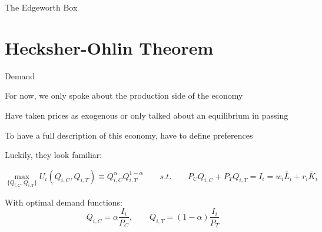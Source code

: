 \documentclass[notes,11pt, aspectratio=169, xcolor=table]{beamer}
\newenvironment{wideitemize}{\itemize\addtolength{\itemsep}{10pt}}{\enditemize}
\begin{document}
\begin{frame}{The Edgeworth Box}

\end{frame}


\section{Hecksher-Ohlin Theorem}

\begin{frame}{Demand}

\begin{wideitemize}
    \item For now, we only spoke about the production side of the economy
    \item Have taken prices as exogenous or only talked about an equilibrium in passing
    \item To have a full description of this economy, have to define preferences
    \item Luckily, they look familiar:

    \begin{equation*}
    \max_{\{Q_{i,C}, Q_{i,T}\}} U_i(Q_{i,C}, Q_{i,T}) \equiv Q_{i,C}^{\alpha} Q_{i,T}^{1-\alpha} \qquad s.t. \qquad P_{C} Q_{i,C} + P_{T} Q_{i,T} = I_i = w_i \bar{L}_i + r_{i} \bar{K}_{i}
\end{equation*}

    \item With optimal demand functions:
\begin{equation*}\label{eq: demand}
    Q_{i,C} = \alpha  \frac{I_i}{P_{C}}, \qquad Q_{i,T} = (1-\alpha) \frac{I_i}{P_{T}}
\end{equation*}
\end{wideitemize}
    
\end{frame}
\end{document}
